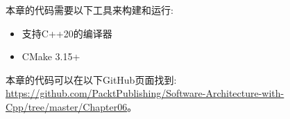 
本章的代码需要以下工具来构建和运行:

\begin{itemize}
\item 支持C++20的编译器
\item CMake 3.15+
\end{itemize}

本章的代码可以在以下GitHub页面找到: \url{https://github.com/PacktPublishing/Software-Architecture-with-Cpp/tree/master/Chapter06}。